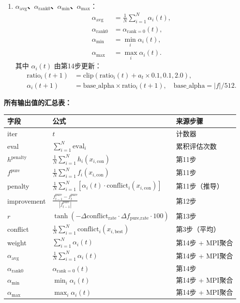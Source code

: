 \documentclass[11pt,a3paper]{ctexart}
\begin{document}
\begin{enumerate}
    \item \textbf{$\alpha_{\text{avg}}$、$\alpha_{\text{rank0}}$、$\alpha_{\min}$、$\alpha_{\max}$}：
    \begin{align}
    \alpha_{\text{avg}} &= \frac{1}{N}\sum_{i=1}^{N}\alpha_i(t), \\
    \alpha_{\text{rank0}} &= \alpha_{\text{rank}=0}(t), \\
    \alpha_{\min} &= \min_i \alpha_i(t), \\
    \alpha_{\max} &= \max_i \alpha_i(t).
    \end{align}
    其中 $\alpha_i(t)$ 由第14步更新：
    \begin{align}
    \text{ratio}_i(t+1) &= \text{clip}(\text{ratio}_i(t) + a_t \times 0.1, 0.1, 2.0), \\
    \alpha_i(t+1) &= \text{base\_alpha} \times \text{ratio}_i(t+1),\quad \text{base\_alpha}=|f|/512.
    \end{align}
\end{enumerate}

\textbf{所有输出值的汇总表：}

\begin{center}
\begin{tabular}{|l|l|l|}
\hline
\textbf{字段} & \textbf{公式} & \textbf{来源步骤} \\
\hline
iter & $t$ & 计数器 \\
\hline
eval & $\sum_{i=1}^N \text{eval}_i$ & 累积评估次数 \\
\hline
$h^{\text{penalty}}$ & $\frac{1}{N}\sum_{i=1}^N h_i(x_{i,\text{con}})$ & 第11步 \\
\hline
$f^{\text{pure}}$ & $\frac{1}{N}\sum_{i=1}^N f_i(x_{i,\text{con}})$ & 第11步 \\
\hline
penalty & $\frac{1}{N}\sum_{i=1}^N [\alpha_i(t) \cdot \text{conflict}_i(x_{i,\text{con}})]$ & 第11步（推导） \\
\hline
improvement & $\frac{f_{t-1}^{\text{pure}} - f_t^{\text{pure}}}{|f_{t-1}^{\text{pure}}|}$ & 第12步 \\
\hline
$r$ & $\tanh\!\left(-\Delta\text{conflict}_{\text{rate}} \cdot \Delta f_{\text{pure,rate}} \cdot 100\right)$ & 第13步 \\
\hline
conflict & $\frac{1}{N}\sum_{i=1}^N \text{conflict}_i(x_{i,\text{best}})$ & 第3步（平均） \\
\hline
weight & $\sum_{i=1}^N \alpha_i(t)$ & 第14步 + MPI聚合 \\
\hline
$\alpha_{\text{avg}}$ & $\frac{1}{N}\sum_{i=1}^N \alpha_i(t)$ & 第14步 + MPI聚合 \\
\hline
$\alpha_{\text{rank0}}$ & $\alpha_{\text{rank}=0}(t)$ & 第14步 \\
\hline
$\alpha_{\min}$ & $\min_i \alpha_i(t)$ & 第14步 + MPI聚合 \\
\hline
$\alpha_{\max}$ & $\max_i \alpha_i(t)$ & 第14步 + MPI聚合 \\
\hline
\end{tabular}
\end{center}
\end{document}
